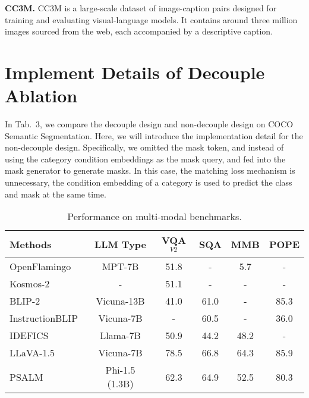 \noindent\textbf{CC3M.} CC3M is a large-scale dataset of image-caption pairs designed for training and evaluating visual-language models. It contains around three million images sourced from the web, each accompanied by a descriptive caption. 

\section{Implement Details of Decouple Ablation}
In Tab.~3, we compare the decouple design and non-decouple design on COCO Semantic Segmentation. Here, we will introduce the implementation detail for the non-decouple design. Specifically, we omitted the mask token, and instead of using the category condition embeddings as the mask query, and fed into the mask generator to generate masks. In this case, the matching loss mechanism is unnecessary, the condition embedding of a category is used to predict the class and mask at the same time. 

\begin{table}[h!]
\centering
\footnotesize
\caption{Performance on multi-modal benchmarks.}
\begin{tabular}{lccccc}
\toprule
Methods         & LLM Type          & VQA$^{V2}$ & SQA & MMB & POPE \\ \midrule
OpenFlamingo~\cite{flamingo}    & MPT-7B        & 51.8   & -         & 5.7     & -    \\
Kosmos-2~\cite{kosmos_2}        & -            & 51.1   & -         & -       & -    \\
BLIP-2~\cite{blip2}          & Vicuna-13B    & 41.0   & 61.0      & -       & 85.3 \\
InstructionBLIP~\cite{dai2024instructblip} & Vicuna-7B    & -      & 60.5      & -       & 36.0 \\
IDEFICS~\cite{idefics}           & Llama-7B    & 50.9      & 44.2         & 48.2    & - \\
LLaVA-1.5~\cite{llavav1_5}       & Vicuna-7B & 78.5   & 66.8      & 64.3    & 85.9\\
\midrule
PSALM            & Phi-1.5 (1.3B) & 62.3   & 64.9      & 52.5    & 80.3 \\ \bottomrule
\end{tabular}
\label{tab:vl_bench}
\end{table}

